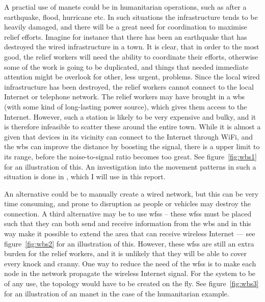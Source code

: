 A practial use of \acp{manet} could be in humanitarian operations, such as after a earthquake, flood, hurricane etc. In such situations the infrastructure tends to be heavily damaged, and there will be a great need for coordination to maximise relief efforts. Imagine for instance that there has been an earthquake that has destroyed the wired infrastructure in a town. It is clear, that in order to the most good, the relief workers will need the ability to coordinate their efforts, otherwise some of the work is going to be duplicated, and things that needed immediate attention might be overlook for other, less urgent, problems. Since the local wired infrastructure has been destroyed, the relief workers cannot connect to the local Internet or telephone network. The relief workers may have brought in a \ac{wbs} (with some kind of long-lasting power source), which gives them access to the Internet. However, such a station is likely to be very expensive and bulky, and it is therefore infeasible to scatter these around the entire town. While it is almost a given that devices in its vicinity can connect to the Internet through WiFi, and the \ac{wbs} can improve the distance by boosting the signal, there is a upper limit to its range, before the noise-to-signal ratio becomes too great. See figure~\ref{fig:wbs1} for an illustration of this. An investigation into the movement patterns in such a situation is done in \cite{disasterArea}, which I will use in this report.


An alternative could be to manually create a wired network, but this can be very time consuming, and prone to disruption as people or vehicles may destroy the connection. A third alternative may be to use \acp{wfs} -- these \acp{wfs} must be placed such that they can both send and receive information from the \ac{wbs} and in this way  make it possible to extend the area that can receive wireless Internet --- see  figure~\ref{fig:wbs2} for an illustration of this. However, these \acp{wfs} are still an extra burden for the relief workers, and it is unlikely that they will be able to cover every knock and cranny. One way to reduce the need of the \acp{wfs} is to make each node in the network propagate the wireless Internet signal. For the system to be of any use, the topology would have to be created on the fly. See figure~\ref{fig:wbs3} for an illustration of an \ac{manet} in the case of the humanitarian example.
 
